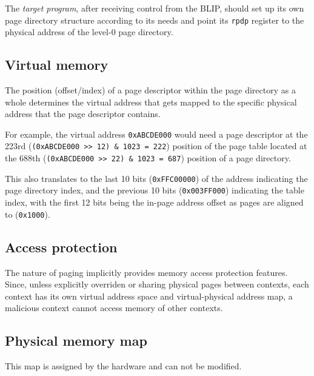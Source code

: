 \documentclass[a4paper,10pt]{article}
\begin{document}
The \emph{target program}, after receiving control from the \gls{BLIP}, should set up its own page directory structure according to its needs and point its \verb|rpdp| register to the physical address of the level-0 page directory.

\subsection{Virtual memory}
The position (offset/index) of a page descriptor within the page directory as a whole determines the virtual address that gets mapped to the specific physical address that the page descriptor contains.

For example, the virtual address \verb|0xABCDE000| would need a page descriptor at the 223rd (\verb|(0xABCDE000 >> 12) & 1023 = 222|) position of the page table located at the 688th (\verb|(0xABCDE000 >> 22) & 1023 = 687|) position of a page directory.

This also translates to the last 10 bits (\verb|0xFFC00000|) of the address indicating the page directory index, and the previous 10 bits (\verb|0x003FF000|) indicating the table index, with the first 12 bits being the in-page address offset as pages are aligned to (\verb|0x1000|).

\subsection{Access protection}
The nature of paging implicitly provides memory access protection features. Since, unless explicitly overriden or sharing physical pages between contexts, each context has its own virtual address space and virtual-physical address map, a malicious context cannot access memory of other contexts.

\subsection{Physical memory map} \label{mm:PML}
This map is assigned by the hardware and can not be modified.
\end{document}
